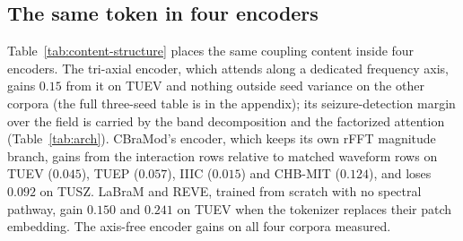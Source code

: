 \subsection{The same token in four encoders}
\label{sec:content-structure}

Table~\ref{tab:content-structure} places the same coupling content inside
four encoders. The tri-axial encoder, which attends along a dedicated
frequency axis, gains $0.15$ from it on TUEV and nothing outside seed
variance on the other corpora (the full three-seed table is in the
appendix); its seizure-detection margin over the field is carried by the
band decomposition and the factorized attention (Table~\ref{tab:arch}).
CBraMod's encoder, which keeps its own rFFT magnitude branch, gains from
the interaction rows relative to matched waveform rows on TUEV ($0.045$),
TUEP ($0.057$), IIIC ($0.015$) and CHB-MIT ($0.124$), and loses $0.092$ on
TUSZ. LaBraM and REVE, trained from scratch with no spectral pathway,
gain $0.150$ and $0.241$ on TUEV when the tokenizer replaces their patch
embedding. The axis-free encoder gains on all four corpora measured.

\begin{table}[t]
\centering
\small
\caption{The same coupling content in four encoders: change in the primary
metric when it is switched on (tri-axial, axis-free: duplex vs.\ waveform
tokens; CBraMod: interaction rows vs.\ matched waveform rows added to the
native tokenizer; LaBraM, REVE: CroFreMo tokenizer vs.\ native, hosts from
scratch). Tri-axial: three seeds; the rest single seeds.}
\label{tab:content-structure}
\end{table}

